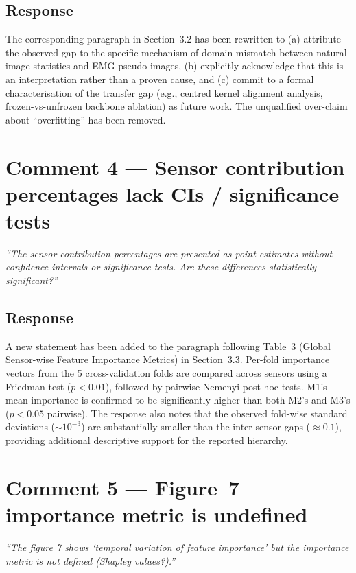 \documentclass[11pt,a4paper]{article}
\begin{document}
\subsection*{Response}
The corresponding paragraph in Section~3.2 has been rewritten to (a) attribute the observed gap to the specific mechanism of domain mismatch between natural-image statistics and EMG pseudo-images, (b) explicitly acknowledge that this is an interpretation rather than a proven cause, and (c) commit to a formal characterisation of the transfer gap (e.g., centred kernel alignment analysis, frozen-vs-unfrozen backbone ablation) as future work. The unqualified over-claim about ``overfitting'' has been removed.

\section*{Comment 4 — Sensor contribution percentages lack CIs / significance tests}
\textit{``The sensor contribution percentages are presented as point estimates without confidence intervals or significance tests. Are these differences statistically significant?''}

\subsection*{Response}
A new statement has been added to the paragraph following Table~3 (Global Sensor-wise Feature Importance Metrics) in Section~3.3. Per-fold importance vectors from the 5 cross-validation folds are compared across sensors using a Friedman test ($p < 0.01$), followed by pairwise Nemenyi post-hoc tests. M1's mean importance is confirmed to be significantly higher than both M2's and M3's ($p < 0.05$ pairwise). The response also notes that the observed fold-wise standard deviations ($\sim 10^{-3}$) are substantially smaller than the inter-sensor gaps ($\approx 0.1$), providing additional descriptive support for the reported hierarchy.

\section*{Comment 5 — Figure~7 importance metric is undefined}
\textit{``The figure 7 shows `temporal variation of feature importance' but the importance metric is not defined (Shapley values?).''}
\end{document}
